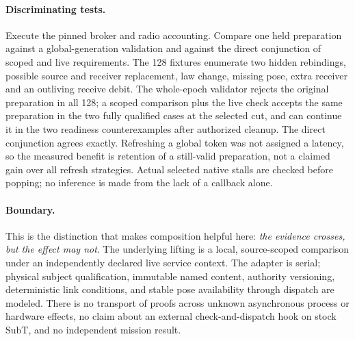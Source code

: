 \documentclass{article}
\begin{document}
\paragraph{Discriminating tests.}
Execute the pinned broker and radio accounting. Compare
one held preparation against a global-generation validation and
against the direct conjunction of scoped and live requirements.
The 128 fixtures enumerate two hidden rebindings, possible source
and receiver replacement, law change, missing pose, extra receiver
and an outliving receive debit. The whole-epoch validator rejects
the original preparation in all 128; a scoped comparison plus the
live check accepts the same preparation in the two fully qualified
cases at the selected cut, and can continue it in the two readiness
counterexamples after authorized cleanup. The direct conjunction
agrees exactly. Refreshing a global token was not assigned a
latency, so the measured benefit is retention of a still-valid
preparation, not a claimed gain over all refresh strategies.
Actual selected native stalls are checked before popping; no
inference is made from the lack of a callback alone.

\paragraph{Boundary.}
This is the distinction that makes composition helpful here:
\emph{the evidence crosses, but the effect may not}. The underlying
lifting is a local, source-scoped comparison under an independently
declared live service context. The adapter is serial; physical subject
qualification, immutable named content, authority versioning,
deterministic link conditions, and stable pose availability
through dispatch are modeled. There is no transport of proofs across
unknown asynchronous process or hardware effects, no claim about an
external check-and-dispatch hook on stock SubT, and no independent
mission result.
\end{document}
